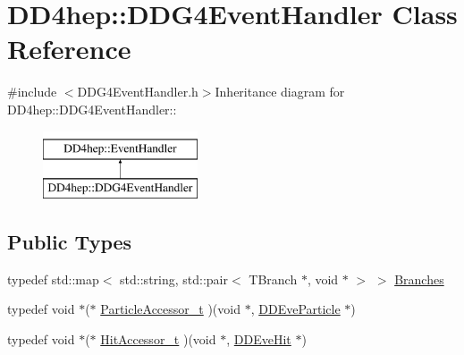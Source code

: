 \hypertarget{class_d_d4hep_1_1_d_d_g4_event_handler}{
\section{DD4hep::DDG4EventHandler Class Reference}
\label{class_d_d4hep_1_1_d_d_g4_event_handler}
}


{\ttfamily \#include $<$DDG4EventHandler.h$>$}Inheritance diagram for DD4hep::DDG4EventHandler::\begin{figure}[H]
\begin{center}
\leavevmode
\includegraphics[height=2cm]{class_d_d4hep_1_1_d_d_g4_event_handler}
\end{center}
\end{figure}
\subsection*{Public Types}
\begin{DoxyCompactItemize}
\item 
typedef std::map$<$ std::string, std::pair$<$ TBranch $\ast$, void $\ast$ $>$ $>$ \hyperlink{class_d_d4hep_1_1_d_d_g4_event_handler_accd112cdbf8673e3a80d97e2d5c98241}{Branches}
\item 
typedef void $\ast$($\ast$ \hyperlink{class_d_d4hep_1_1_d_d_g4_event_handler_a5d1ac46722967ffdd5e1a15147d3c6bb}{ParticleAccessor\_\-t} )(void $\ast$, \hyperlink{class_d_d4hep_1_1_d_d_eve_particle}{DDEveParticle} $\ast$)
\item 
typedef void $\ast$($\ast$ \hyperlink{class_d_d4hep_1_1_d_d_g4_event_handler_a2f34a2e7c2b1a6cb2c9fc1b7270d707e}{HitAccessor\_\-t} )(void $\ast$, \hyperlink{class_d_d4hep_1_1_d_d_eve_hit}{DDEveHit} $\ast$)
\end{DoxyCompactItemize}
